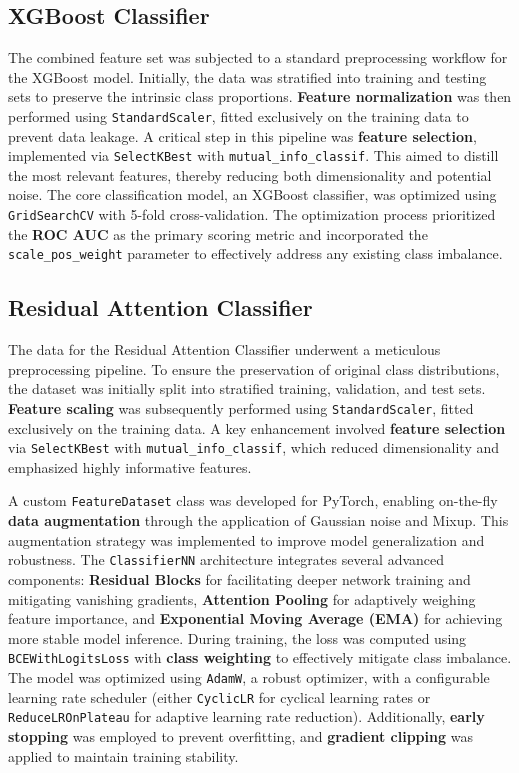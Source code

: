\documentclass{article}
\begin{document}
\subsection{XGBoost Classifier}
The combined feature set was subjected to a standard preprocessing workflow for the XGBoost model. Initially, the data was stratified into training and testing sets to preserve the intrinsic class proportions. \textbf{Feature normalization} was then performed using \texttt{StandardScaler}, fitted exclusively on the training data to prevent data leakage. A critical step in this pipeline was \textbf{feature selection}, implemented via \texttt{SelectKBest} with \texttt{mutual\_info\_classif}. This aimed to distill the most relevant features, thereby reducing both dimensionality and potential noise. The core classification model, an XGBoost classifier, was optimized using \texttt{GridSearchCV} with 5-fold cross-validation. The optimization process prioritized the \textbf{ROC AUC} as the primary scoring metric and incorporated the \texttt{scale\_pos\_weight} parameter to effectively address any existing class imbalance.

\subsection{Residual Attention Classifier}
The data for the Residual Attention Classifier underwent a meticulous preprocessing pipeline. To ensure the preservation of original class distributions, the dataset was initially split into stratified training, validation, and test sets. \textbf{Feature scaling} was subsequently performed using \texttt{StandardScaler}, fitted exclusively on the training data. A key enhancement involved \textbf{feature selection} via \texttt{SelectKBest} with \texttt{mutual\_info\_classif}, which reduced dimensionality and emphasized highly informative features.

A custom \texttt{FeatureDataset} class was developed for PyTorch, enabling on-the-fly \textbf{data augmentation} through the application of Gaussian noise and Mixup. This augmentation strategy was implemented to improve model generalization and robustness. The \texttt{ClassifierNN} architecture integrates several advanced components: \textbf{Residual Blocks} for facilitating deeper network training and mitigating vanishing gradients, \textbf{Attention Pooling} for adaptively weighing feature importance, and \textbf{Exponential Moving Average (EMA)} for achieving more stable model inference. During training, the loss was computed using \texttt{BCEWithLogitsLoss} with \textbf{class weighting} to effectively mitigate class imbalance. The model was optimized using \texttt{AdamW}, a robust optimizer, with a configurable learning rate scheduler (either \texttt{CyclicLR} for cyclical learning rates or \texttt{ReduceLROnPlateau} for adaptive learning rate reduction). Additionally, \textbf{early stopping} was employed to prevent overfitting, and \textbf{gradient clipping} was applied to maintain training stability.
\end{document}
